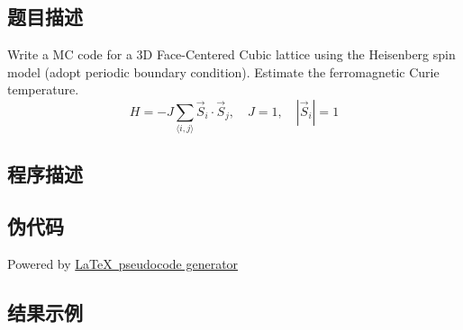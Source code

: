 \subsection{题目描述}
\noindent
Write a MC code for a 3D Face-Centered Cubic lattice using the Heisenberg spin
model (adopt periodic boundary condition). Estimate the ferromagnetic Curie temperature.
\[
    H = -J \sum_{\langle i,j \rangle} \vec{S}_i \cdot \vec{S}_j, \quad J = 1, \quad |\vec{S}_i| = 1
\]


\subsection{程序描述}

\subsection{伪代码}
Powered by \href{https://chatgpt.com/g/g-xJJAA2awf-latex-pseudocode-generator}{\LaTeX \ pseudocode generator}


\subsection{结果示例}

